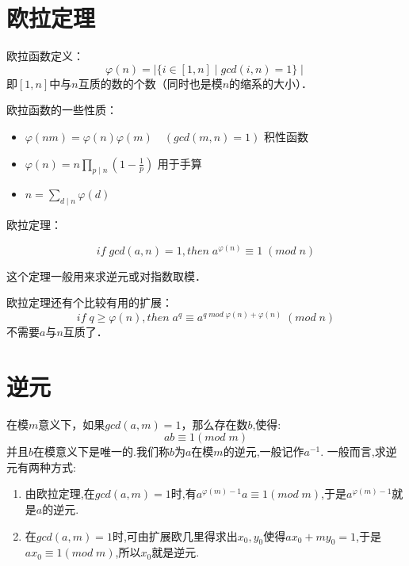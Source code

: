 \documentclass{beamer}
\begin{document}
	\section{欧拉定理}
		\begin{frame}
			欧拉函数定义：
			$$
				\varphi(n) =  \mid \{  i \in [1,n] \mid gcd(i,n) = 1 \}   \mid
			$$
			即$[1,n]$中与$n$互质的数的个数（同时也是模$n$的缩系的大小）．
			
			\pause
			
			欧拉函数的一些性质：
			\begin{itemize}
				\item $\varphi(nm) = \varphi(n)\varphi(m)  \quad (gcd(m,n) = 1)$  积性函数
				\item $\varphi(n) = n\prod_{p \mid n} (1 - \frac{1}{p}) $ 用于手算
				\item $ n = \sum_{d \mid n}\varphi(d)$  
			\end{itemize}

		\end{frame}
		
		\begin{frame}
			欧拉定理：
			
			$$
				if \; gcd(a,n) = 1, then \; a^{\varphi(n)} \equiv 1 \; (mod \; n)
			$$
			
			\pause
			
			这个定理一般用来求逆元或对指数取模．
			
			\pause
			
			欧拉定理还有个比较有用的扩展：
			$$
				if \; q \geq \varphi(n), then \; a^{q} \equiv a^{q \; mod\; \varphi(n) + \varphi(n)} \; (mod \; n)
			$$
			不需要$a$与$n$互质了．
			
		\end{frame}
	\section{逆元}
		\begin{frame}
			在模$m$意义下，如果$gcd(a,m) = 1$，那么存在数$b$,使得:
			$$
				ab \equiv 1 (mod \; m)
			$$
			并且$b$在模意义下是唯一的.我们称$b$为$a$在模$m$的逆元,一般记作$a^{-1}$.
			\pause
			一般而言,求逆元有两种方式:
			\begin{enumerate}
				\item 由欧拉定理,在$gcd(a,m) = 1$时,有$a^{\varphi(m)-1} a \equiv 1 (mod \; m)$,于是$a^{\varphi(m)-1}$就是$a$的逆元.\pause
				\item 在$gcd(a,m) = 1$时,可由扩展欧几里得求出$x_0,y_0$使得$ax_0+my_0=1$,于是$ax_0 \equiv 1 (mod \; m)$,所以$x_0$就是逆元.
			\end{enumerate}
		\end{frame}
\end{document}
